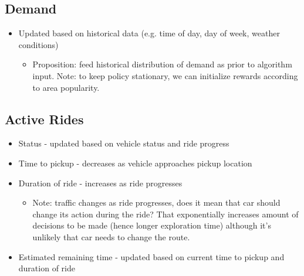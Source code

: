 \documentclass[12pt]{article}
\begin{document}
\subsection*{Demand}
\begin{itemize}
		\item Updated based on historical data (e.g. time of day, day of week, weather conditions)
        \begin{itemize}
            \item Proposition: feed historical distribution of demand as prior to algorithm input. Note: to keep policy stationary, we can initialize rewards according to area popularity.
        \end{itemize}
\end{itemize}
\subsection*{Active Rides}
\begin{itemize}
		\item Status - updated based on vehicle status and ride progress
		\item Time to pickup - decreases as vehicle approaches pickup location
		\item Duration of ride - increases as ride progresses
        \begin{itemize}
            \item Note: traffic changes as ride progresses, does it mean that car should change its action during the ride? That exponentially increases amount of decisions to be made (hence longer exploration time) although it's unlikely that car needs to change the route.
        \end{itemize}
		\item Estimated remaining time - updated based on current time to pickup and duration of ride
\end{itemize}
\end{document}
